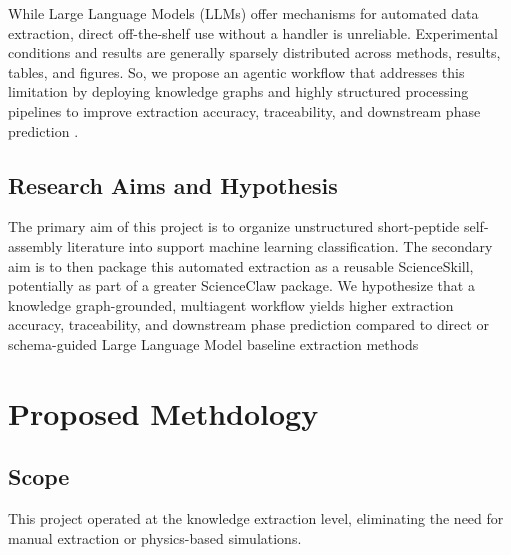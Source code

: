 While Large Language Models (LLMs) offer mechanisms for automated data extraction, direct off-the-shelf use without a handler is unreliable. Experimental conditions and results are generally sparsely distributed across methods, results, tables, and figures. So, we propose an agentic workflow that addresses this limitation by deploying knowledge graphs and highly structured processing pipelines to improve extraction accuracy, traceability, and downstream phase prediction \cite{stewart_graphagents_2026}. 
\subsection{Research Aims and Hypothesis}
The primary aim of this project is to organize unstructured short-peptide self-assembly literature into support machine learning classification. The secondary aim is to then package this automated extraction as a reusable ScienceSkill, potentially as part of a greater ScienceClaw package. 
We hypothesize that a knowledge graph-grounded, multiagent workflow yields higher extraction accuracy, traceability, and downstream phase prediction compared to direct or schema-guided Large Language Model baseline extraction methods \cite{stewart_graphagents_2026,buehler_accelerating_2024}
\section{Proposed Methdology}

\subsection{Scope}
This project operated at the knowledge extraction level, eliminating the need for manual extraction or physics-based simulations.

